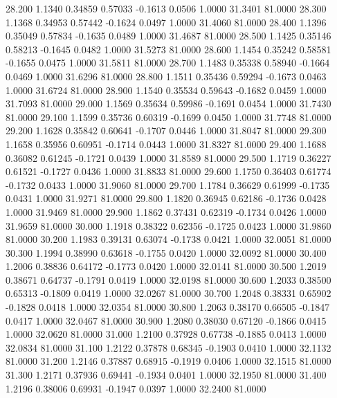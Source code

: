   28.200   1.1340   0.34859   0.57033  -0.1613   0.0506   1.0000  31.3401  81.0000
  28.300   1.1368   0.34953   0.57442  -0.1624   0.0497   1.0000  31.4060  81.0000
  28.400   1.1396   0.35049   0.57834  -0.1635   0.0489   1.0000  31.4687  81.0000
  28.500   1.1425   0.35146   0.58213  -0.1645   0.0482   1.0000  31.5273  81.0000
  28.600   1.1454   0.35242   0.58581  -0.1655   0.0475   1.0000  31.5811  81.0000
  28.700   1.1483   0.35338   0.58940  -0.1664   0.0469   1.0000  31.6296  81.0000
  28.800   1.1511   0.35436   0.59294  -0.1673   0.0463   1.0000  31.6724  81.0000
  28.900   1.1540   0.35534   0.59643  -0.1682   0.0459   1.0000  31.7093  81.0000
  29.000   1.1569   0.35634   0.59986  -0.1691   0.0454   1.0000  31.7430  81.0000
  29.100   1.1599   0.35736   0.60319  -0.1699   0.0450   1.0000  31.7748  81.0000
  29.200   1.1628   0.35842   0.60641  -0.1707   0.0446   1.0000  31.8047  81.0000
  29.300   1.1658   0.35956   0.60951  -0.1714   0.0443   1.0000  31.8327  81.0000
  29.400   1.1688   0.36082   0.61245  -0.1721   0.0439   1.0000  31.8589  81.0000
  29.500   1.1719   0.36227   0.61521  -0.1727   0.0436   1.0000  31.8833  81.0000
  29.600   1.1750   0.36403   0.61774  -0.1732   0.0433   1.0000  31.9060  81.0000
  29.700   1.1784   0.36629   0.61999  -0.1735   0.0431   1.0000  31.9271  81.0000
  29.800   1.1820   0.36945   0.62186  -0.1736   0.0428   1.0000  31.9469  81.0000
  29.900   1.1862   0.37431   0.62319  -0.1734   0.0426   1.0000  31.9659  81.0000
  30.000   1.1918   0.38322   0.62356  -0.1725   0.0423   1.0000  31.9860  81.0000
  30.200   1.1983   0.39131   0.63074  -0.1738   0.0421   1.0000  32.0051  81.0000
  30.300   1.1994   0.38990   0.63618  -0.1755   0.0420   1.0000  32.0092  81.0000
  30.400   1.2006   0.38836   0.64172  -0.1773   0.0420   1.0000  32.0141  81.0000
  30.500   1.2019   0.38671   0.64737  -0.1791   0.0419   1.0000  32.0198  81.0000
  30.600   1.2033   0.38500   0.65313  -0.1809   0.0419   1.0000  32.0267  81.0000
  30.700   1.2048   0.38331   0.65902  -0.1828   0.0418   1.0000  32.0354  81.0000
  30.800   1.2063   0.38170   0.66505  -0.1847   0.0417   1.0000  32.0467  81.0000
  30.900   1.2080   0.38030   0.67120  -0.1866   0.0415   1.0000  32.0620  81.0000
  31.000   1.2100   0.37928   0.67738  -0.1885   0.0413   1.0000  32.0834  81.0000
  31.100   1.2122   0.37878   0.68345  -0.1903   0.0410   1.0000  32.1132  81.0000
  31.200   1.2146   0.37887   0.68915  -0.1919   0.0406   1.0000  32.1515  81.0000
  31.300   1.2171   0.37936   0.69441  -0.1934   0.0401   1.0000  32.1950  81.0000
  31.400   1.2196   0.38006   0.69931  -0.1947   0.0397   1.0000  32.2400  81.0000
